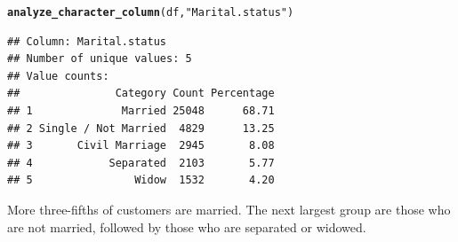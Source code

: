\documentclass{article}\usepackage[]{graphicx}\usepackage[]{xcolor}
\makeatletter
\newcommand{\hlsng}[1]{\textcolor[rgb]{0.192,0.494,0.8}{#1}}%
\newcommand{\hldef}[1]{\textcolor[rgb]{0.345,0.345,0.345}{#1}}%
\newcommand{\hlkwd}[1]{\textcolor[rgb]{0.737,0.353,0.396}{\textbf{#1}}}%
\newenvironment{kframe}{%
 \def\at@end@of@kframe{}%
 \ifinner\ifhmode%
  \def\at@end@of@kframe{\end{minipage}}%
  \begin{minipage}{\columnwidth}%
 \fi\fi%
 \def\FrameCommand##1{\hskip\@totalleftmargin \hskip-\fboxsep
 \colorbox{shadecolor}{##1}\hskip-\fboxsep
     \hskip-\linewidth \hskip-\@totalleftmargin \hskip\columnwidth}%
 \MakeFramed {\advance\hsize-\width
   \@totalleftmargin\z@ \linewidth\hsize
   \@setminipage}}%
 {\par\unskip\endMakeFramed%
 \at@end@of@kframe}
\newenvironment{knitrout}{}{} %
\makeatother
\begin{document}
\begin{knitrout}
\color{fgcolor}\begin{kframe}
\begin{alltt}
\hlkwd{analyze_character_column}\hldef{(df,} \hlsng{"Marital.status"}\hldef{)}
\end{alltt}
\begin{verbatim}
## Column: Marital.status 
## Number of unique values: 5 
## Value counts:
##               Category Count Percentage
## 1              Married 25048      68.71
## 2 Single / Not Married  4829      13.25
## 3       Civil Marriage  2945       8.08
## 4            Separated  2103       5.77
## 5                Widow  1532       4.20
\end{verbatim}
\end{kframe}
\end{knitrout}

More three-fifths of customers are married. The next largest group are those who are not married, followed by those who are separated or widowed.
\end{document}
